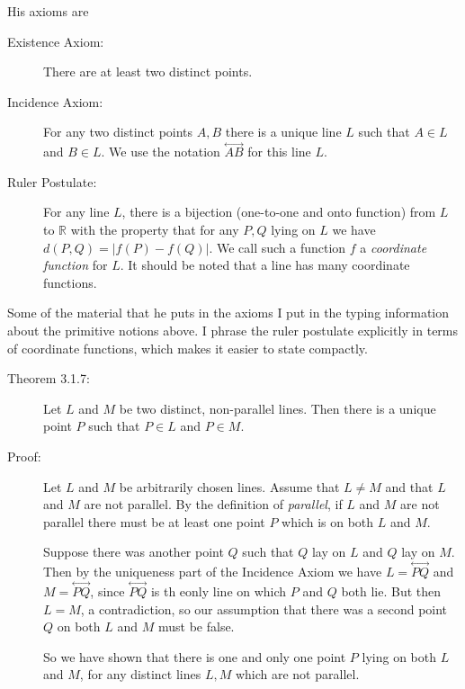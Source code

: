 \documentclass[12pt]{article}
\newcommand\Line[1]{\overset{\leftrightarrow}{#1}}
\begin{document}
His axioms are 

\begin{description}

\item[Existence Axiom:]  There are at least two distinct points.

\item[Incidence Axiom:]  For any two distinct points $A,B$ there is a unique line $L$ such that $A \in L$ and $B \in L$.  We use the notation $\Line{AB}$ for this line $L$.

\item[Ruler Postulate:]  For any line $L$, there is a bijection (one-to-one and onto function) from $L$ to $\mathbb R$ with the property that for any $P,Q$ lying on $L$
we have $d(P,Q)=|f(P)-f(Q)|$.  We call such a function $f$ a {\em coordinate function\/} for $L$.  It should be noted that a line has many coordinate functions.

\end{description}

Some of the material that he puts in the axioms I put in the typing information about the primitive notions above.   I phrase the ruler postulate explicitly in terms of coordinate functions, which makes it easier to state compactly.

\begin{description}

\item[Theorem 3.1.7:]  Let $L$ and $M$ be two distinct, non-parallel lines.  Then there is a unique point $P$ such that $P \in L$ and $P\in  M$.

\item[Proof:]   Let $L$ and $M$ be arbitrarily chosen lines.  Assume that $L\neq M$ and that $L$ and $M$ are not parallel.  By the definition of {\em parallel\/}, if $L$ and $M$ are not parallel there must be at least one point $P$ which is on both $L$ and $M$.  


Suppose there was another point $Q$ such that $Q$ lay on $L$ and $Q$ lay on $M$.  Then by the uniqueness part of the Incidence Axiom we have $L=\Line{PQ}$ and $M = \Line{PQ}$, since $\Line{PQ}$ is th eonly line on which $P$ and $Q$ both lie.  But then $L=M$, a contradiction, so our assumption that there was a second point $Q$ on both $L$ and $M$ must be false.

So we have shown that there is one and only one point $P$ lying on both $L$ and $M$, for any distinct lines $L,M$ which are not parallel.

\end{description}
\end{document}
